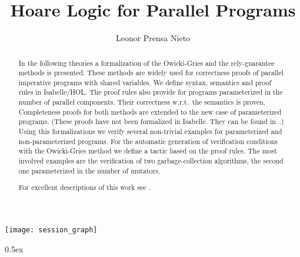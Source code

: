 \documentclass[11pt,a4paper]{report}
\begin{document}
\title{Hoare Logic for Parallel Programs}
\author{Leonor Prensa Nieto}
\maketitle

\begin{abstract}\noindent
  In the following theories a formalization of the Owicki-Gries and
  the rely-guarantee methods is presented. These methods are widely
  used for correctness proofs of parallel imperative programs with
  shared variables.  We define syntax, semantics and proof rules in
  Isabelle/HOL.  The proof rules also provide for programs
  parameterized in the number of parallel components. Their
  correctness w.r.t.\ the semantics is proven.  Completeness proofs
  for both methods are extended to the new case of parameterized
  programs. (These proofs have not been formalized in Isabelle. They
  can be found in~\cite{Prensa-PhD}.)  Using this formalizations we
  verify several non-trivial examples for parameterized and
  non-parameterized programs.  For the automatic generation of
  verification conditions with the Owicki-Gries method we define a
  tactic based on the proof rules.  The most involved examples are the
  verification of two garbage-collection algorithms, the second one
  parameterized in the number of mutators.

For excellent descriptions of this work see
\cite{NipkowP-FASE99,PrenEsp00,Prensa-PhD,Prensa-ESOP03}.

\end{abstract}

\pagestyle{plain}
\thispagestyle{empty}
\tableofcontents

\clearpage

\begin{center}
  \texttt{[image: session\_graph]}  
\end{center}

\newpage

\parindent 0pt\parskip 0.5ex




\end{document}
